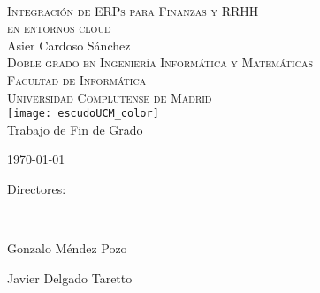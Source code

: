 \begin{titlepage}
	\begin{center}

		~\\[1.5cm]
		\textsc{\Large Integración de ERPs para Finanzas y RRHH\\ en entornos cloud}\\[1.5cm]

		{\Large Asier Cardoso Sánchez}\\[1.5cm]
        
        \textsc{\normalsize Doble grado en Ingeniería Informática y Matemáticas \\ Facultad de Informática \\ Universidad Complutense de Madrid}\\[1.5cm]
		
		
		\texttt{[image: escudoUCM\_color]}\\[1.5cm]
        
        {\normalsize Trabajo de Fin de Grado}
		
		\vfill
		{\large \today}\\[1cm]
	\end{center}
    
    \begin{flushright}
        Directores:

        \ 
        
        Gonzalo Méndez Pozo
        
		Javier Delgado Taretto
    \end{flushright}
\end{titlepage}
